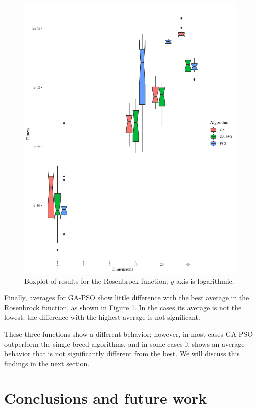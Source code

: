 \documentclass[runningheads]{llncs}
\begin{document}
\begin{figure}[h!tbp]
  \centering
  \includegraphics[height=0.4\textheight]{img/rosenbrock-boxplot.png}
  \caption{Boxplot of results for the Rosenbrock function; $y$ axis is logarithmic.\label{fig:boxplot:rosenbrock}}
\end{figure}
%

Finally, averages for GA-PSO show little difference with the best
average in the Rosenbrock function, as shown in Figure
\ref{fig:boxplot:rosenbrock}. In the cases its average is not the
lowest; the difference with the highest average is not significant.

These three functions show a different behavior; however, in most
cases GA-PSO outperform the single-breed algorithms, and in some cases
it shows an average behavior that is not significantly different from
the best. We will discuss this findings in the next section.

\section{Conclusions and future work}
\end{document}
